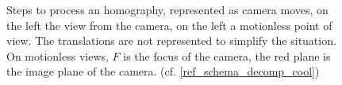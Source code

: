 \begin{figure}
		\caption{Steps to process an homography, represented as camera moves, on the left the view from the camera, on the left a motionless point of view. The translations are not represented to simplify the situation. On motionless views, $F$ is the focus of the camera, the red plane is the image plane of the camera. (cf. \ref{ref_schema_decomp_cool})}
		\label{schema_decomp_cool}
		\label{SchemaEtapesDecompoGeometrique}
	\end{figure}
	\clearpage
